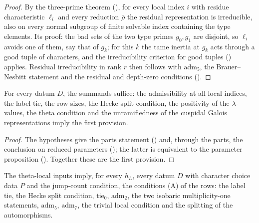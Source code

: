 \begin{proof}
By the three-prime theorem (), for every local
index $i$ with residue characteristic $\ell_i$ and every reduction $\bar\rho$ the residual representation is irreducible, also on
every normal subgroup of finite solvable index containing the type elements. Its proof: the bad sets of the two type primes
$g_0,g_1$ are disjoint, so $\ell_i$ avoids one of them, say that of $g_k$; for this $k$ the tame inertia at $g_k$ acts through a good
tuple of characters, and the irreducibility criterion for good tuples
() applies. Residual irreducibility in rank $r$ then follows with
$\mathrm{adm}_5$, the Brauer--Nesbitt statement \cite{CurtisReiner1962} and the residual and depth-zero conditions
().
\end{proof}

\begin{lemma}\label{pf:stageU:parts}
For every datum $D$, the summands suffice: the admissibility at all local indices, the label tie, the row sizes, the Hecke split
condition, the positivity of the $\lambda$-values, the theta condition and the unramifiedness of the cuspidal Galois
representations imply the first provision.
\end{lemma}

\begin{proof}
The hypotheses give the parts statement () and, through the parts, the conclusion on
reduced parameters (); the latter is equivalent to the parameter
proposition (). Together these are the first
provision.
\end{proof}

\begin{lemma}[Conditions (A)]\label{pf:stageU:aclose}
The theta-local inputs imply, for every $h_L$, every datum $D$ with character choice data $P$ and the jump-count condition, the
conditions (A) of the rows: the label tie, the Hecke split condition, $\mathrm{tie}_0$, $\mathrm{adm}_2$, the two isobaric multiplicity-one
statements, $\mathrm{adm}_5$, $\mathrm{adm}_7$, the trivial local condition and the splitting of the automorphisms.
\end{lemma}

